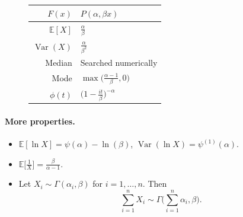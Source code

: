 \documentclass[a4paper,11pt]{article}
\theoremstyle{plain}
\theoremstyle{definition}
\newcommand{\ME}{\mathbb{E}}
\newcommand{\Var}{\operatorname{Var}}
\begin{document}
\begin{figure}[!htb]
\begin{minipage}{0.4\textwidth}
\begin{tabular}{| r | l |}
				\hline
				$F(x)$ & $P(\alpha, \beta x) $\\
				\hline
				$\ME[X]$ & $ \frac{\alpha}{\beta}$ \\
				\hline
				$\Var(X)$ & $\frac{\alpha}{\beta^2}$ \\
				\hline
				Median & Searched numerically \\
				\hline
				Mode & $\max\big(\frac{\alpha - 1}{\beta}, 0\big)$ \\
				\hline
				$\phi(t)$ & $ \Big( 1-\frac{it}{\beta} \Big)^{-\alpha}$ \\
				\hline
			\end{tabular}
		\end{minipage}
	\end{figure}
	
	\paragraph{More properties.}
	\begin{itemize}
		\item $\ME[\ln X] = \psi(\alpha) - \ln(\beta)$, $\Var(\ln X) = \psi^{(1)}(\alpha)$.
		\item $\ME\big[ \frac{1}{X} \big] = \frac{\beta}{\alpha - 1}$.
		\item Let $X_i \sim \Gamma(\alpha_i, \beta)$ for $i = 1, \dots , n$. Then 
		\[ \sum_{i=1}^n X_i \sim \Gamma\bigg(\sum_{i=1}^{n} \alpha_i, \beta\bigg). \]
	\end{itemize}
	
\end{document}
